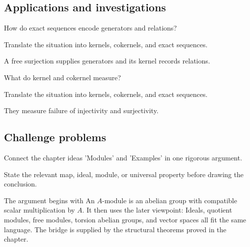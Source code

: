\subsection*{Applications and investigations}

\begin{exercise}[Presentations]\label{exr:v09-expand-13}
How do exact sequences encode generators and relations?
\end{exercise}
\begin{hint}
Translate the situation into kernels, cokernels, and exact sequences.
\end{hint}
\begin{solution}
A free surjection supplies generators and its kernel records relations.
\end{solution}

\begin{exercise}\label{exr:v09-expand-14}
What do kernel and cokernel measure?
\end{exercise}
\begin{hint}
Translate the situation into kernels, cokernels, and exact sequences.
\end{hint}
\begin{solution}
They measure failure of injectivity and surjectivity.
\end{solution}

\subsection*{Challenge problems}

\begin{exercise}\label{exr:v09-expand-15}
Connect the chapter ideas 'Modules' and 'Examples' in one rigorous argument.
\end{exercise}
\begin{hint}
State the relevant map, ideal, module, or universal property before drawing the conclusion.
\end{hint}
\begin{solution}
The argument begins with An $A$-module is an abelian group with compatible scalar multiplication by $A$. It then uses the later viewpoint: Ideals, quotient modules, free modules, torsion abelian groups, and vector spaces all fit the same language. The bridge is supplied by the structural theorems proved in the chapter.
\end{solution}

